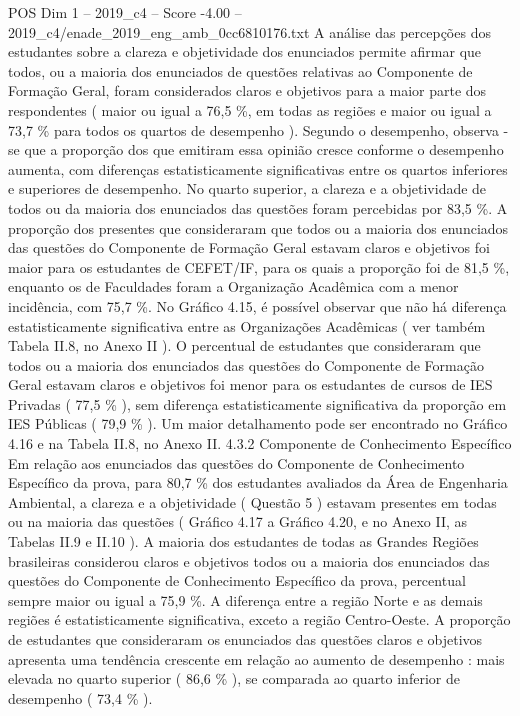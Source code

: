 \begin{textsample}{POS Dim 1 – 2019\_c4 – Score -4.00 – 2019\_c4/enade\_2019\_eng\_amb\_0cc6810176.txt}
A análise das percepções dos estudantes sobre a clareza e objetividade dos enunciados permite afirmar que todos, ou a maioria dos enunciados de questões relativas ao Componente de Formação Geral, foram considerados claros e objetivos para a maior parte dos respondentes ( maior ou igual a 76,5 \%, em todas as regiões e maior ou igual a 73,7 \% para todos os quartos de desempenho ).
Segundo o desempenho, observa -se que a proporção dos que emitiram essa opinião cresce conforme o desempenho aumenta, com diferenças estatisticamente significativas entre os quartos inferiores e superiores de desempenho.
No quarto superior, a clareza e a objetividade de todos ou da maioria dos enunciados das questões foram percebidas por 83,5 \%.
A proporção dos presentes que consideraram que todos ou a maioria dos enunciados das questões do Componente de Formação Geral estavam claros e objetivos foi maior para os estudantes de CEFET/IF, para os quais a proporção foi de 81,5 \%, enquanto os de Faculdades foram a Organização Acadêmica com a menor incidência, com 75,7 \%.
No Gráfico 4.15, é possível observar que não há diferença estatisticamente significativa entre as Organizações Acadêmicas ( ver também Tabela II.8, no Anexo II ).
O percentual de estudantes que consideraram que todos ou a maioria dos enunciados das questões do Componente de Formação Geral estavam claros e objetivos foi menor para os estudantes de cursos de IES Privadas ( 77,5 \% ), sem diferença estatisticamente significativa da proporção em IES Públicas ( 79,9 \% ).
Um maior detalhamento pode ser encontrado no Gráfico 4.16 e na Tabela II.8, no Anexo II. 4.3.2 Componente de Conhecimento Específico Em relação aos enunciados das questões do Componente de Conhecimento Específico da prova, para 80,7 \% dos estudantes avaliados da Área de Engenharia Ambiental, a clareza e a objetividade ( Questão 5 ) estavam presentes em todas ou na maioria das questões ( Gráfico 4.17 a Gráfico 4.20, e no Anexo II, as Tabelas II.9 e II.10 ).
A maioria dos estudantes de todas as Grandes Regiões brasileiras considerou claros e objetivos todos ou a maioria dos enunciados das questões do Componente de Conhecimento Específico da prova, percentual sempre maior ou igual a 75,9 \%.
A diferença entre a região Norte e as demais regiões é estatisticamente significativa, exceto a região Centro-Oeste.
A proporção de estudantes que consideraram os enunciados das questões claros e objetivos apresenta uma tendência crescente em relação ao aumento de desempenho : mais elevada no quarto superior ( 86,6 \% ), se comparada ao quarto inferior de desempenho ( 73,4 \% ).

\end{textsample}
